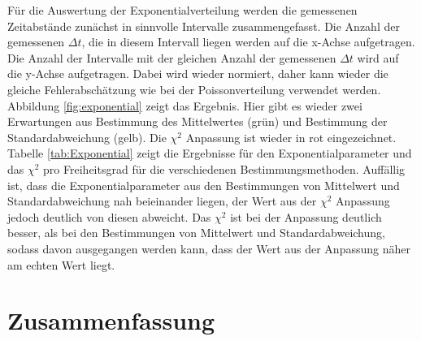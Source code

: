 \documentclass[12pt,a4paper]{article}
\begin{document}
Für die Auswertung der Exponentialverteilung werden die gemessenen Zeitabstände zunächst in sinnvolle Intervalle zusammengefasst. Die Anzahl der gemessenen $\Delta t$, die in diesem Intervall liegen werden auf die x-Achse aufgetragen. Die Anzahl der Intervalle mit der gleichen Anzahl der gemessenen $\Delta t$ wird auf die y-Achse aufgetragen. Dabei wird wieder normiert, daher kann wieder die gleiche Fehlerabschätzung wie bei der Poissonverteilung verwendet werden. Abbildung \ref{fig:exponential} zeigt das Ergebnis. Hier gibt es wieder zwei Erwartungen aus Bestimmung des Mittelwertes (grün) und Bestimmung der Standardabweichung (gelb). Die $\chi ^2$ Anpassung ist wieder in rot eingezeichnet.\\
Tabelle \ref{tab:Exponential} zeigt die Ergebnisse für den Exponentialparameter und das $\chi ^2$ pro Freiheitsgrad für die verschiedenen Bestimmungsmethoden. Auffällig ist, dass die Exponentialparameter aus den Bestimmungen von Mittelwert und Standardabweichung nah beieinander liegen, der Wert aus der $\chi ^2$ Anpassung jedoch deutlich von diesen abweicht. Das $\chi ^2$ ist bei der Anpassung deutlich besser, als bei den Bestimmungen von Mittelwert und Standardabweichung, sodass davon ausgegangen werden kann, dass der Wert aus der Anpassung näher am echten Wert liegt.

\section{Zusammenfassung}




	
\end{document}

